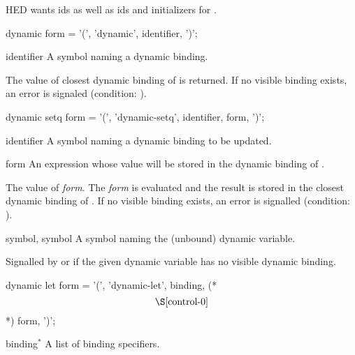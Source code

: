 \label{control-1}
%
\begin{optPrivate}
    HED wants ids as well as ids and initializers for .
\end{optPrivate}
%
\begin{optDefinition}
%
%
\Syntax
\savesyntax\dynamicSyntax\vbox{\syntax
dynamic form
   = '(', 'dynamic', identifier, ')';
\endsyntax}
%
\begin{arguments}
    \item[identifier] A symbol naming a dynamic binding.
\end{arguments}
%
\result%
The value of closest dynamic binding of \identifier{} is returned.  If no
visible binding exists, an error is signaled (condition:
).

%
\Syntax
\savesyntax\dynamicSetqSyntax\vbox{\syntax
dynamic setq form
   = '(', 'dynamic-setq', identifier, form, ')';
\endsyntax}
%
\begin{arguments}
    \item[identifier] A symbol naming a dynamic binding to be updated.

    \item[form] An expression whose value will be stored in the dynamic binding
    of \identifier{}.
\end{arguments}
%
\result%
The value of {\em form}.
%
\remarks%
The {\em form} is evaluated and the result is stored in the closest dynamic
binding of \identifier{}.  If no visible binding exists, an error is
signalled (condition: 
).

%
\begin{initoptions}
    \item[symbol, symbol] A symbol naming the (unbound) dynamic variable.
\end{initoptions}
%
\remarks%
Signalled by  or  if the given
dynamic variable has no visible dynamic binding.

%
\Syntax
\savesyntax\dynamicLetSyntax\vbox{\syntax
dynamic let form
   = '(', 'dynamic-let',
     {binding}, (* \[\S\ref{control-0}\] *)
     {form}, ')';
\endsyntax}
%
\begin{arguments}
    \item[binding\/$^*$] A list of binding specifiers.


\end{arguments}
\end{optDefinition}
